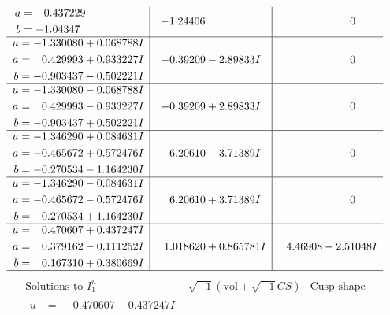 \documentclass[1p]{elsarticle_modified}
\theoremstyle{definition}
\newcommand{\I}{\sqrt{-1}}
\begin{document}
$$\begin{array}{c|c|c}
\begin{aligned}
a &= \phantom{-}0.437229\phantom{ +0.000000I} \\
b &= -1.04347\phantom{ +0.000000I}\end{aligned}
 & -1.24406\phantom{ +0.000000I} & \phantom{-0.000000 } 0 \\ \hline\begin{aligned}
u &= -1.330080 + 0.068788 I \\
a &= \phantom{-}0.429993 + 0.933227 I \\
b &= -0.903437 - 0.502221 I\end{aligned}
 & -0.39209 - 2.89833 I & \phantom{-0.000000 } 0 \\ \hline\begin{aligned}
u &= -1.330080 - 0.068788 I \\
a &= \phantom{-}0.429993 - 0.933227 I \\
b &= -0.903437 + 0.502221 I\end{aligned}
 & -0.39209 + 2.89833 I & \phantom{-0.000000 } 0 \\ \hline\begin{aligned}
u &= -1.346290 + 0.084631 I \\
a &= -0.465672 + 0.572476 I \\
b &= -0.270534 - 1.164230 I\end{aligned}
 & \phantom{-}6.20610 - 3.71389 I & \phantom{-0.000000 } 0 \\ \hline\begin{aligned}
u &= -1.346290 - 0.084631 I \\
a &= -0.465672 - 0.572476 I \\
b &= -0.270534 + 1.164230 I\end{aligned}
 & \phantom{-}6.20610 + 3.71389 I & \phantom{-0.000000 } 0 \\ \hline\begin{aligned}
u &= \phantom{-}0.470607 + 0.437247 I \\
a &= \phantom{-}0.379162 - 0.111252 I \\
b &= \phantom{-}0.167310 + 0.380669 I\end{aligned}
 & \phantom{-}1.018620 + 0.865781 I & \phantom{-}4.46908 - 2.51048 I\\
 \hline 
 \end{array}$$\newpage$$\begin{array}{c|c|c}  
\text{Solutions to }I^u_{1}& \I (\text{vol} + \sqrt{-1}CS) & \text{Cusp shape}\\
 \hline 
\begin{aligned}
u &= \phantom{-}0.470607 - 0.437247 I \\

\end{aligned}
\end{array}$$
\end{document}
